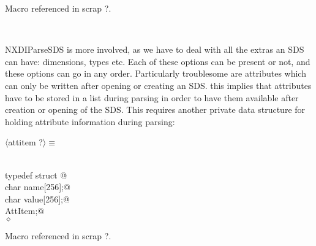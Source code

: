 \documentclass[12pt]{article}
\begin{document}
\begin{flushleft}
\begin{minipage}{\linewidth}
\begin{list}{}{}
\mbox{}\verb@       return NX_ERROR;@\\
\mbox{}\verb@   }@\\
\mbox{}\verb@@$\diamond$
\end{list}
\vspace{-1ex}
\footnotesize\addtolength{\baselineskip}{-1ex}
\begin{list}{}{\setlength{\itemsep}{-\parsep}\setlength{\itemindent}{-\leftmargin}}
\item Macro referenced in scrap ?.
\end{list}
\end{minipage}\\[4ex]
\end{flushleft}
NXDIParseSDS is more involved, as we have to deal with all the extras an SDS
can have: dimensions, types etc. Each of these options can be present or
not, and these options can go in any order. Particularly troublesome are
attributes which can only be written after opening or creating an SDS. this
implies that attributes have to be stored in a list during parsing in order
to have them available after creation or opening of the SDS. This requires
another private data structure for holding attribute information during
parsing:
\begin{flushleft} \small
\begin{minipage}{\linewidth} \label{scrap22}
$\langle$attitem {\footnotesize ?}$\rangle\equiv$
\vspace{-1ex}
\begin{list}{}{} \item
\mbox{}\verb@@\\
\mbox{}\verb@  typedef struct {@\\
\mbox{}\verb@                   char name[256];@\\
\mbox{}\verb@                   char value[256];@\\
\mbox{}\verb@                  }AttItem;@\\
\mbox{}\verb@@$\diamond$
\end{list}
\vspace{-1ex}
\footnotesize\addtolength{\baselineskip}{-1ex}
\begin{list}{}{\setlength{\itemsep}{-\parsep}\setlength{\itemindent}{-\leftmargin}}
\item Macro referenced in scrap ?.
\end{list}
\end{minipage}\\[4ex]
\end{flushleft}
\end{document}
